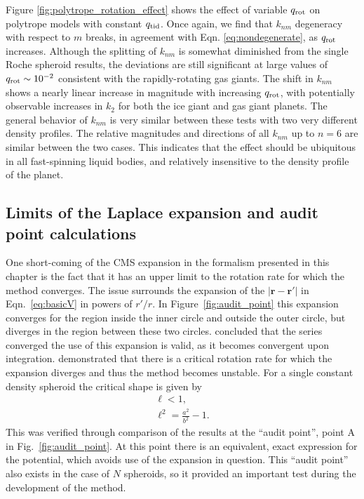 Figure \ref{fig:polytrope_rotation_effect} shows the effect of variable $q_{\rm rot}$
on polytrope models with constant $q_{\rm tid}$. Once again, we find that $k_{nm}$
degeneracy with respect to $m$ breaks, in agreement with Eqn.
\eqref{eq:nondegenerate}, as $q_{\rm rot}$ increases. Although the splitting of
$k_{nm}$ is somewhat diminished from the single Roche spheroid results, the
deviations are still significant at large values of $q_{\rm rot}\sim 10^{-2}$
consistent with the rapidly-rotating gas giants. The shift in $k_{nm}$ shows a nearly
linear increase in magnitude with increasing $q_{\rm rot}$, with potentially
observable increases in $k_2$ for both the ice giant and gas giant planets. The
general behavior of $k_{nm}$ is very similar between these tests with two very
different density profiles. The relative magnitudes and directions of all $k_{nm}$ up
to $n=6$ are similar between the two cases. This indicates that the effect should be
ubiquitous in all fast-spinning liquid bodies, and relatively insensitive to the
density profile of the planet.

\subsection{Limits of the Laplace expansion and audit point calculations}\label{expansion}

One short-coming of the CMS expansion in the formalism presented in this chapter is
the fact that it has an upper limit to the rotation rate for which the method
converges. The issue surrounds the expansion of the
$\left|\mathbf{r}-\mathbf{r'}\right|$ in Eqn.~\ref{eq:basicV} in powers of $r'/r$. In
Figure~\ref{fig:audit_point} this expansion converges for the region inside the inner
circle and outside the outer circle, but diverges in the region between these two
circles. \citet{zharkov1978} concluded that the series converged the use of this
expansion is valid, as it becomes convergent upon integration. \citet{Hubbard2014}
demonstrated that there is a critical rotation rate for which the expansion diverges
and thus the method becomes unstable. For a single constant density spheroid the
critical shape is given by
%
\begin{equation}\label{eq:crit_ell}
\begin{aligned}
    \ell < 1, \\
    \ell^2 = \frac{a^2}{b^2}-1.
\end{aligned}
\end{equation}
%
This was verified through comparison of the results at the ``audit point'', point A in
Fig.~\ref{fig:audit_point}. At this point there is an equivalent, exact expression
for the potential, which avoids use of the expansion in question. This ``audit
point'' also exists in the case of $N$ spheroids, so it provided an important test during
the development of the method.

